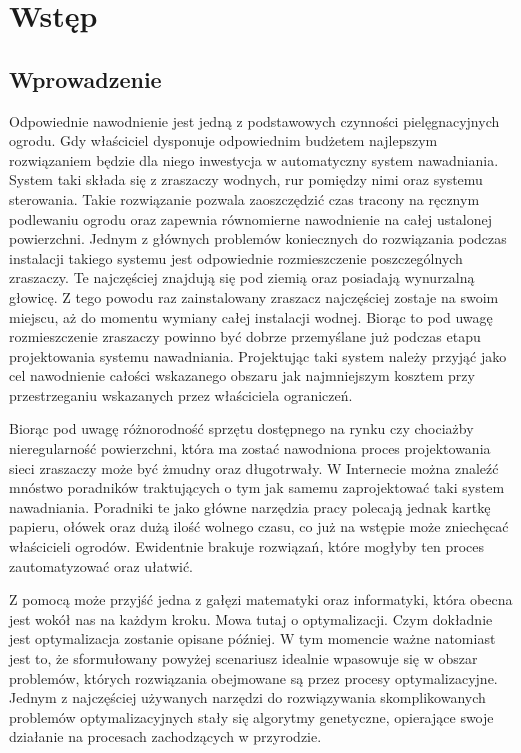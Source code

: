\documentclass[twoside]{iisthesis}
\begin{document}
\maketitle

\textpages

\graphicspath{ {img/} }
\chapter{Wstęp}
\section{Wprowadzenie}
Odpowiednie nawodnienie jest jedną z podstawowych czynności pielęgnacyjnych ogrodu. Gdy właściciel dysponuje odpowiednim budżetem najlepszym rozwiązaniem będzie dla niego inwestycja w automatyczny system nawadniania. System taki składa się z zraszaczy wodnych, rur pomiędzy nimi oraz systemu sterowania. Takie rozwiązanie pozwala zaoszczędzić czas tracony na ręcznym podlewaniu ogrodu oraz zapewnia równomierne nawodnienie na całej ustalonej powierzchni. Jednym z głównych problemów koniecznych do rozwiązania podczas instalacji takiego systemu jest odpowiednie rozmieszczenie poszczególnych zraszaczy. Te najczęściej znajdują się pod ziemią oraz posiadają wynurzalną głowicę. Z tego powodu raz zainstalowany zraszacz najczęściej zostaje na swoim miejscu, aż do momentu wymiany całej instalacji wodnej. Biorąc to pod uwagę rozmieszczenie zraszaczy powinno być dobrze przemyślane już podczas etapu projektowania systemu nawadniania. Projektując taki system należy przyjąć jako cel nawodnienie całości wskazanego obszaru jak najmniejszym kosztem przy przestrzeganiu wskazanych przez właściciela ograniczeń.

Biorąc pod uwagę różnorodność sprzętu dostępnego na rynku czy chociażby nieregularność powierzchni, która ma zostać nawodniona proces projektowania sieci zraszaczy może być żmudny oraz długotrwały. W Internecie można znaleźć mnóstwo poradników traktujących o tym jak samemu zaprojektować taki system nawadniania. Poradniki te jako główne narzędzia pracy polecają jednak kartkę papieru, ołówek oraz dużą ilość wolnego czasu, co już na wstępie może zniechęcać właścicieli ogrodów. Ewidentnie brakuje rozwiązań, które mogłyby ten proces zautomatyzować oraz ułatwić.
 
Z pomocą może przyjść jedna z gałęzi matematyki oraz informatyki, która obecna jest wokół nas na każdym kroku. Mowa tutaj o optymalizacji. Czym dokładnie jest optymalizacja zostanie opisane później. W tym momencie ważne natomiast jest to, że sformułowany powyżej scenariusz idealnie wpasowuje się w obszar problemów, których rozwiązania obejmowane są przez procesy optymalizacyjne. Jednym z najczęściej używanych narzędzi do rozwiązywania skomplikowanych problemów optymalizacyjnych stały się algorytmy genetyczne, opierające swoje działanie na procesach zachodzących w przyrodzie.
\end{document}
